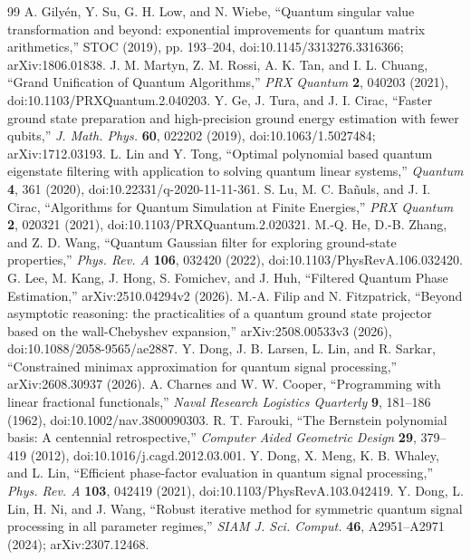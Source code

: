 \begin{thebibliography}{99}
 A. Gily\'en, Y. Su, G. H. Low, and N. Wiebe, ``Quantum singular value transformation and beyond: exponential improvements for quantum matrix arithmetics,'' STOC (2019), pp. 193--204, doi:10.1145/3313276.3316366; arXiv:1806.01838.
 J. M. Martyn, Z. M. Rossi, A. K. Tan, and I. L. Chuang, ``Grand Unification of Quantum Algorithms,'' \emph{PRX Quantum} \textbf{2}, 040203 (2021), doi:10.1103/PRXQuantum.2.040203.
 Y. Ge, J. Tura, and J. I. Cirac, ``Faster ground state preparation and high-precision ground energy estimation with fewer qubits,'' \emph{J. Math. Phys.} \textbf{60}, 022202 (2019), doi:10.1063/1.5027484; arXiv:1712.03193.
 L. Lin and Y. Tong, ``Optimal polynomial based quantum eigenstate filtering with application to solving quantum linear systems,'' \emph{Quantum} \textbf{4}, 361 (2020), doi:10.22331/q-2020-11-11-361.
 S. Lu, M. C. Ba\~nuls, and J. I. Cirac, ``Algorithms for Quantum Simulation at Finite Energies,'' \emph{PRX Quantum} \textbf{2}, 020321 (2021), doi:10.1103/PRXQuantum.2.020321.
 M.-Q. He, D.-B. Zhang, and Z. D. Wang, ``Quantum Gaussian filter for exploring ground-state properties,'' \emph{Phys. Rev. A} \textbf{106}, 032420 (2022), doi:10.1103/PhysRevA.106.032420.
 G. Lee, M. Kang, J. Hong, S. Fomichev, and J. Huh, ``Filtered Quantum Phase Estimation,'' arXiv:2510.04294v2 (2026).
 M.-A. Filip and N. Fitzpatrick, ``Beyond asymptotic reasoning: the practicalities of a quantum ground state projector based on the wall-Chebyshev expansion,'' arXiv:2508.00533v3 (2026), doi:10.1088/2058-9565/ae2887.
 Y. Dong, J. B. Larsen, L. Lin, and R. Sarkar, ``Constrained minimax approximation for quantum signal processing,'' arXiv:2608.30937 (2026).
 A. Charnes and W. W. Cooper, ``Programming with linear fractional functionals,'' \emph{Naval Research Logistics Quarterly} \textbf{9}, 181--186 (1962), doi:10.1002/nav.3800090303.
 R. T. Farouki, ``The Bernstein polynomial basis: A centennial retrospective,'' \emph{Computer Aided Geometric Design} \textbf{29}, 379--419 (2012), doi:10.1016/j.cagd.2012.03.001.
 Y. Dong, X. Meng, K. B. Whaley, and L. Lin, ``Efficient phase-factor evaluation in quantum signal processing,'' \emph{Phys. Rev. A} \textbf{103}, 042419 (2021), doi:10.1103/PhysRevA.103.042419.
 Y. Dong, L. Lin, H. Ni, and J. Wang, ``Robust iterative method for symmetric quantum signal processing in all parameter regimes,'' \emph{SIAM J. Sci. Comput.} \textbf{46}, A2951--A2971 (2024); arXiv:2307.12468.

\end{thebibliography}
